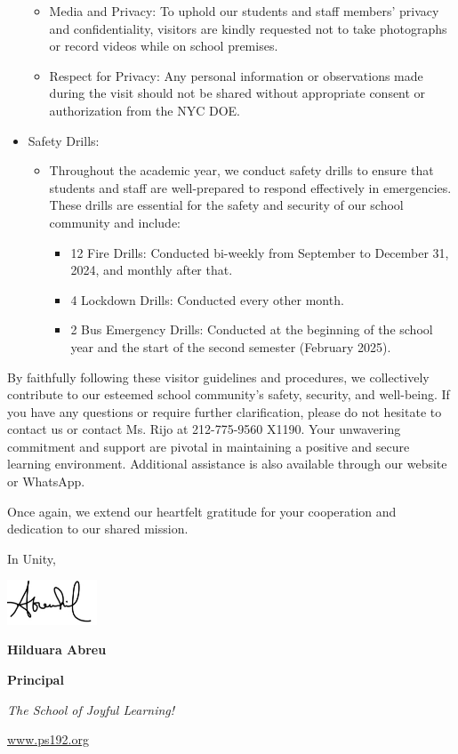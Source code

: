 \documentclass[12pt,letterpaper]{article}
\begin{document}
\begin{itemize}
\begin{itemize}
		\item Media and Privacy: To uphold our students and staff members' privacy and confidentiality, visitors are kindly requested not to take photographs or record videos while on school premises.
		\item Respect for Privacy: Any personal information or observations made during the visit should not be shared without appropriate consent or authorization from the NYC DOE.
		\end{itemize}
	\item Safety Drills:
		\begin{itemize}
		\item Throughout the academic year, we conduct safety drills to ensure that students and staff are well-prepared to respond effectively in emergencies. These drills are essential for the safety and security of our school community and include:
			\begin{itemize}
			\item 12 Fire Drills: Conducted bi-weekly from September to December 31, 2024, and monthly after that.
			\item 4 Lockdown Drills: Conducted every other month.
			\item 2 Bus Emergency Drills: Conducted at the beginning of the school year and the start of the second semester (February 2025).
			\end{itemize}
		\end{itemize}
\end{itemize}
\pagebreak
\vspace*{1.5cm}
By faithfully following these visitor guidelines and procedures, we collectively contribute to our esteemed school community's safety, security, and well-being. If you have any questions or require further clarification, please do not hesitate to contact us or contact Ms. Rijo at 212-775-9560 X1190. Your unwavering commitment and support are pivotal in maintaining a positive and secure learning environment. Additional assistance is also available through our website or WhatsApp.

Once again, we extend our heartfelt gratitude for your cooperation and dedication to our shared mission.

In Unity,

\includegraphics[width=0.2\textwidth]{hil_signature}

\textbf{Hilduara Abreu}

\textbf{Principal}

\textit{The School of Joyful Learning!}

\url{www.ps192.org}
\end{document}
